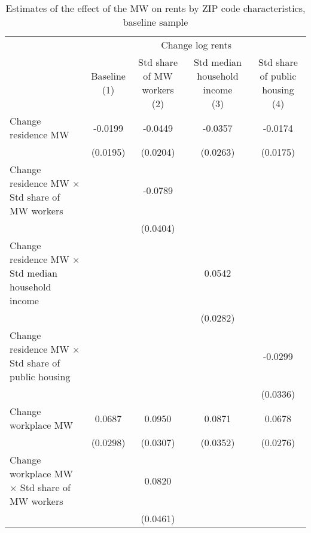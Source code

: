\begin{table}[hbt!] \centering
    \caption{Estimates of the effect of the MW on rents by ZIP code characteristics, baseline sample}
    \label{tab:heterogeneity}
    \begin{tabular}{@{}lcccc@{}}
        \toprule
            & \multicolumn{4}{c}{Change log rents}                                                  \\ \cmidrule(l){2-5} 
            & \shortstack{Baseline\\(1)} 
            & \shortstack{Std share of MW workers\\(2)}                                             
            & \shortstack{Std median household income\\(3)}
            & \shortstack{Std share of public housing\\(4)}                             \\ \midrule
        Change residence MW                                     &  -0.0199   &  -0.0449  &  -0.0357   &  -0.0174   \\
                                                                & (0.0195)  & (0.0204) & (0.0263)  & (0.0175)  \\
        Change residence MW $\times$ Std share of MW workers    &        &  -0.0789  &        &        \\
                                                                &        & (0.0404) &        &        \\
        Change residence MW $\times$ Std median household income&        &       &  0.0542   &        \\
                                                                &        &       & (0.0282)  &        \\
        Change residence MW $\times$ Std share of public housing&        &       &        &  -0.0299   \\
                                                                &        &       &        & (0.0336)  \\
        Change workplace MW                                     &  0.0687   &  0.0950  &  0.0871   &  0.0678   \\
                                                                & (0.0298)  & (0.0307) & (0.0352)  & (0.0276)  \\
        Change workplace MW $\times$ Std share of MW workers    &        &  0.0820  &        &        \\
                                                                &        & (0.0461) &        &        \\

\end{tabular}
\end{table}

